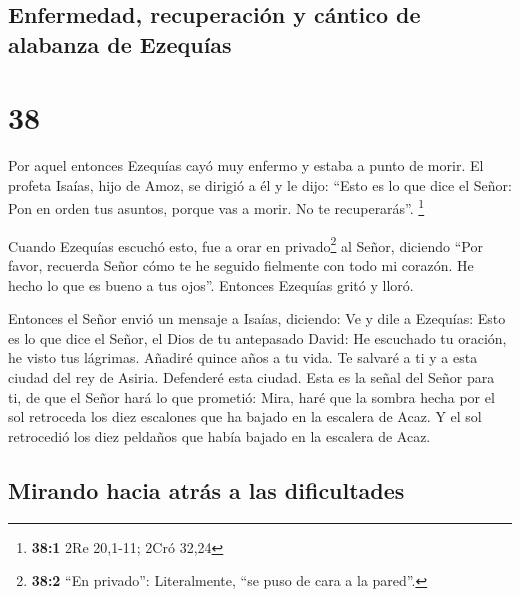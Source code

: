 \hypertarget{enfermedad-recuperaciuxf3n-y-cuxe1ntico-de-alabanza-de-ezequuxedas}{%
\subsection{Enfermedad, recuperación y cántico de alabanza de
Ezequías}\label{enfermedad-recuperaciuxf3n-y-cuxe1ntico-de-alabanza-de-ezequuxedas}}

\hypertarget{section-37}{%
\section{38}\label{section-37}}

 Por aquel entonces Ezequías cayó muy enfermo y estaba a
punto de morir. El profeta Isaías, hijo de Amoz, se dirigió a él y le
dijo: ``Esto es lo que dice el Señor: Pon en orden tus asuntos, porque
vas a morir. No te recuperarás''. \footnote{\textbf{38:1} 2Re 20,1-11;
  2Cró 32,24}

 Cuando Ezequías escuchó esto, fue a orar en
privado\footnote{\textbf{38:2} ``En privado'': Literalmente, ``se puso
  de cara a la pared''.} al Señor, diciendo  ``Por favor,
recuerda Señor cómo te he seguido fielmente con todo mi corazón. He
hecho lo que es bueno a tus ojos''. Entonces Ezequías gritó y lloró.

 Entonces el Señor envió un mensaje a Isaías, diciendo:
 Ve y dile a Ezequías: Esto es lo que dice el Señor, el
Dios de tu antepasado David: He escuchado tu oración, he visto tus
lágrimas. Añadiré quince años a tu vida.  Te salvaré a ti
y a esta ciudad del rey de Asiria. Defenderé esta ciudad. 
Esta es la señal del Señor para ti, de que el Señor hará lo que
prometió:  Mira, haré que la sombra hecha por el sol
retroceda los diez escalones que ha bajado en la escalera de Acaz. Y el
sol retrocedió los diez peldaños que había bajado en la escalera de
Acaz.

\hypertarget{mirando-hacia-atruxe1s-a-las-dificultades}{%
\subsection{Mirando hacia atrás a las
dificultades}\label{mirando-hacia-atruxe1s-a-las-dificultades}}

